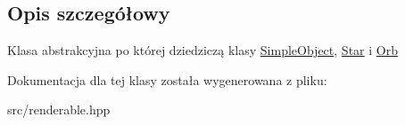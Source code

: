 \subsection{Opis szczegółowy}
Klasa abstrakcyjna po której dziedziczą klasy \hyperlink{class_simple_object}{Simple\+Object}, \hyperlink{class_star}{Star} i \hyperlink{class_orb}{Orb} 

Dokumentacja dla tej klasy została wygenerowana z pliku\+:\begin{DoxyCompactItemize}
\item 
src/renderable.\+hpp\end{DoxyCompactItemize}
